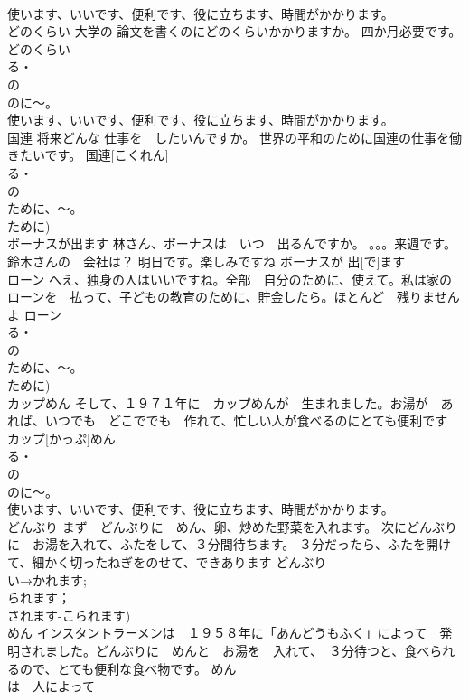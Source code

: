 \documentclass[8pt]{extreport}
\begin{document}
\begin{CJK}{UTF8}{min}
\\	使います、いいです、便利です、役に立ちます、時間がかかります。	
\\	どのくらい	大学の 論文を書くのにどのくらいかかりますか。 四か月必要です。	どのくらい			
\\	る・
\\	の　
\\	のに～。
\\	使います、いいです、便利です、役に立ちます、時間がかかります。		
\\	国連	将来どんな 仕事を　したいんですか。 世界の平和のために国連の仕事を働きたいです。	国連[こくれん]			
\\	る・
\\	の　
\\	ために、～。
\\	ために)
\\	ボーナスが出ます	林さん、ボーナスは　いつ　出るんですか。 。。。来週です。鈴木さんの　会社は？ 明日です。楽しみですね	ボーナスが 出[で]ます			
\\	ローン	へえ、独身の人はいいですね。全部　自分のために、使えて。私は家のローンを　払って、子どもの教育のために、貯金したら。ほとんど　残りませんよ	ローン			
\\	る・
\\	の　
\\	ために、～。
\\	ために)
\\	カップめん	そして、１９７１年に　カップめんが　生まれました。お湯が　あれば、いつでも　どこででも　作れて、忙しい人が食べるのにとても便利です	カップ[かっぷ]めん			
\\	る・
\\	の　
\\	のに～。
\\	使います、いいです、便利です、役に立ちます、時間がかかります。		
\\	どんぶり	まず　どんぶりに　めん、卵、炒めた野菜を入れます。 次にどんぶりに　お湯を入れて、ふたをして、３分間待ちます。 ３分だったら、ふたを開けて、細かく切ったねぎをのせて、できあります	どんぶり						
\\	い→かれます;
\\	られます；
\\	されます-こられます)
\\	めん	インスタントラーメンは　１９５８年に「あんどうもふく」によって　発明されました。どんぶりに　めんと　お湯を　入れて、　３分待つと、食べられるので、とても便利な食べ物です。	めん				
\\	は　人によって　

\end{CJK}
\end{document}
